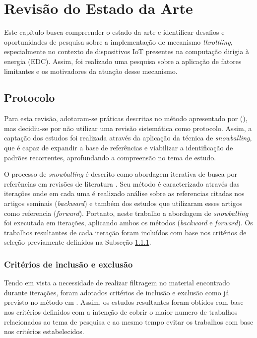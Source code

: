 \chapter{Revisão do Estado da Arte}
\label{cap:cap3}

Este capítulo busca compreender o estado da arte e identificar desafios e oportunidades de pesquisa sobre a implementação de mecanismo \textit{throttling}, especialmente no contexto de dispositivos \acs{IoT} presentes na computação dirigia à energia (\acl{EDC}). Assim, foi realizado uma pesquisa sobre a aplicação de fatores limitantes e os motivadores da atuação desse mecanismo.


\section{Protocolo}
Para esta revisão, adotaram-se práticas descritas no método apresentado por \citeauthor{kitchenham_systematic_2009} (\citeyear{kitchenham_systematic_2009}), mas decidiu-se por não utilizar uma revisão sistemática como protocolo. Assim, a captação dos estudos foi realizada através da aplicação da técnica de \textit{snowballing}, que é capaz de expandir a base de referências e viabilizar a identificação de padrões recorrentes, aprofundando a compreensão no tema de estudo.

O processo de \textit{snowballing} é descrito como abordagem iterativa de busca por referências em revisões de literatura \cite{wohlin_guidelines_2014}. Seu método é caracterizado através das iterações onde em cada uma é realizado análise sobre as referencias citadas nos artigos seminais (\textit{backward}) e também dos estudos que utilizaram esses artigos como referencia (\textit{forward}). Portanto, neste trabalho a abordagem de \textit{snowballing} foi executada em iterações, aplicando ambos os métodos (\textit{backward} e \textit{forward}). Os trabalhos resultantes de cada iteração  foram incluídos com base nos critérios de seleção previamente definidos na Subseção \ref{cap3:criteriosinclusaoexclusao}.


\subsection{Critérios de inclusão e exclusão} 
\label{cap3:criteriosinclusaoexclusao}

Tendo em vista a necessidade de realizar filtragem no material encontrado durante iterações, foram adotados critérios de inclusão e exclusão como já previsto no método em  \cite{wohlin_guidelines_2014}. Assim, os estudos resultantes foram obtidos com base nos critérios definidos com a intenção de cobrir o maior numero de trabalhos relacionados ao tema de pesquisa e ao mesmo tempo evitar os trabalhos com base nos critérios estabelecidos.


